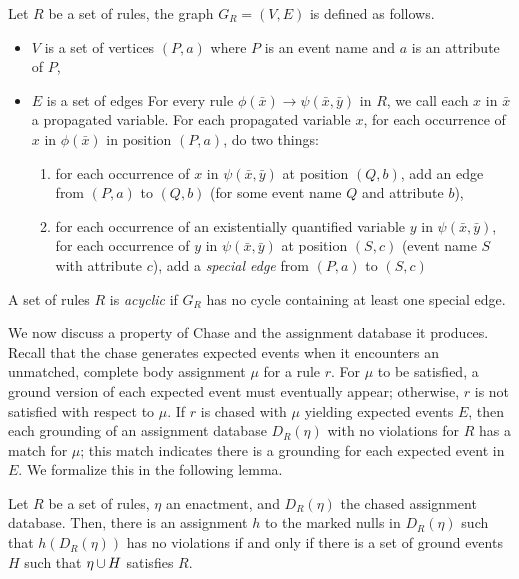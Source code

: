 \begin{deff}
Let $R$ be a set of rules,
the graph $G_{R}=(V,E)$ is defined as follows.
\begin{itemize}
\item
  $V$ is a set of vertices $(P,a)$
  where $P$ is an event name and
  $a$ is an attribute of $P$,
\item
  $E$ is a set of edges
  For every rule $\phi(\bar{x})\rightarrow\psi(\bar{x},\bar{y})$ in
  $R$,
  we call each $x$ in $\bar{x}$ a propagated variable.
  For each propagated variable $x$,
  for each occurrence of $x$ in $\phi(\bar{x})$ in position $(P,a)$,
  do two things:
  \begin{enumerate}
  \item
    for each occurrence of $x$ in $\psi(\bar{x},\bar{y})$ at position
    $(Q,b)$, add an edge from $(P,a)$ to $(Q,b)$ (for some event name
    $Q$ and attribute $b$),
  \item
    for each occurrence of an existentially quantified variable $y$ in
    $\psi(\bar{x},\bar{y})$, 
    for each occurrence of $y$ in $\psi(\bar{x},\bar{y})$
    at position $(S,c)$ (event name $S$ with attribute $c$),
    add a {\it special edge} from $(P,a)$ to $(S,c)$
  \end{enumerate}
\end{itemize}
A set of rules $R$ is {\it acyclic} if $G_{R}$ has no cycle
containing at least one special edge.
\end{deff}

We now discuss a property of {\sf Chase}
and the assignment database it produces.
Recall that the chase generates expected events when it encounters
an unmatched, complete body assignment $\mu$ for a rule $r$.
For $\mu$ to be satisfied, a ground version of each expected event must eventually appear;
otherwise, $r$ is not satisfied with respect to $\mu$.
If $r$ is chased with $\mu$ yielding expected events $E$,
then each grounding of an assignment database $D_{R}(\eta)$
with no violations for $R$
has a match for $\mu$;
this match indicates there is a grounding for each expected event in $E$.
We formalize this in the following lemma.

\begin{lemma}\label{lemma:chase-database}
  Let $R$ be a set of rules,
  $\eta$ an enactment,
  and $D_{R}(\eta)$ the chased assignment database.
  Then,
  there is an assignment $h$ to the marked nulls in $D_{R}(\eta)$
  such that $h(D_{R}(\eta))$ has no violations
  if and only if 
  there is a set of ground events $H$
  such that $\eta\,{\cup}\, H$ satisfies $R$.
\end{lemma}  


